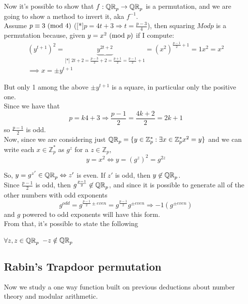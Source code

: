 Now it's possible to show that $f: \QR[p]\to \QR[p] $ is a permutation, and we
are going to show a method to invert it, aka $f^{-1}$.\\

Assume $p\equiv 3 \Mod{4}$
([*]$p=4t+3\Rightarrow t=\frac{p-3}{4}$), then squaring $Mod{p}$ is a permutation because, given
\underline{$y=x^2 \Mod{p}$} if I compute: \begin{gather*}
    (y^{t+1})^2=\underbrace{y^{2t+2}}_{\text{[*]
    }2t+2=\frac{p-3}{2}+2=\frac{p+1}{2}=\frac{p-1}{2}+1}=(x^2)^{\frac{p-1}{2}+1}=1x^2=x^2\\
    \implies x=\pm y^{t+1} \end{gather*}

But only 1 among the above $\pm y^{t+1}$ is a square, in particular only the
positive one.\\
Since we have that 
\[ 
    p=k4+3 \Rightarrow \frac{p-1}{2}=\frac{4k+2}{2}=2k+1
\]
so $\frac{p-1}{2}$ is odd.\\

Now, since we are considering just $\QR[p]=\{y \in \mathbb{Z}_{p}^{*} : \exists
x \in \mathbb{Z}_{p}^{*} x^{2}=y\}$ and we can write each $x \in
\mathbb{Z}_{p}^{*} $ as
$g^{z}$ for a $z \in \mathbb{Z}_{p}$, 
\[
    y=x^{2} \Leftrightarrow y=(g^{z})^{2}=g^{2z}
\]

So, $y=g^{z'} \in \QR[p] \Leftrightarrow z'$ is even. If $z'$ is odd, then $y
\not\in \QR[p] $.\\

Since $\frac{p-1}{2}$ is odd, then $g^{\frac{p-1}{2}} \not\in \QR[p]$, and since
it is possible to generate all of the other numbers with odd exponents 
\[
g^{odd}=g^{\frac{p-1}{2} \pm even}=g^{\frac{p-1}{2}}g^{ \pm even} \Rightarrow
-1(g^{\pm even})
\]
and $g$ powered to odd exponents will have this form.\\

From that, it's possible to state the following
\begin{lemma}
    $\forall z, z\in \QR[p]$ \Leftrightarrow $ -z \notin \QR[p]$
\end{lemma}



\subsection{Rabin's Trapdoor permutation}
Now we study a one way function built on previous deductions about number
theory and modular arithmetic.\\

